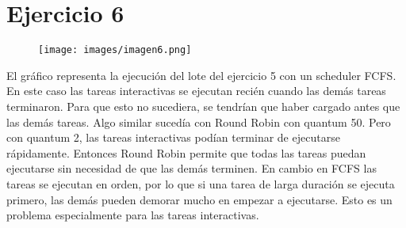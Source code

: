 \section{Ejercicio 6}
\begin{figure}[h]
  \centering
    \texttt{[image: images/imagen6.png]}
  \label{fig:imagen6}
\end{figure}
El gráfico representa la ejecución del lote del ejercicio 5 con un scheduler FCFS. En este caso las tareas interactivas se ejecutan recién cuando las demás tareas terminaron. Para que esto no sucediera, se tendrían que haber cargado antes que las demás tareas.
Algo similar sucedía con Round Robin con quantum 50. Pero con quantum 2, las tareas interactivas podían terminar de ejecutarse rápidamente. Entonces Round Robin permite
que todas las tareas puedan ejecutarse sin necesidad de que las demás terminen. En cambio en FCFS las tareas se ejecutan en orden, por lo que si una tarea de larga duración se ejecuta primero,
las demás pueden demorar mucho en empezar a ejecutarse. Esto es un problema especialmente para las tareas interactivas.